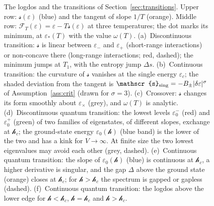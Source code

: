 \documentclass[10pt,a4paper]{article}
\theoremstyle{plain}
\newcommand{\lndos}{{logdos}}  %
\newcommand{\hfield}{\mathscr{h}}  %
\newcommand{\Fen}[1][T]{\mathscr{F}_{#1}}  %
\newcommand{\lds}{\mathscr{s}}  %
\begin{document}
\begin{figure}[htbp]
\caption{The \lndos{} and the transitions of Section~\ref{sec:transitions}.
Upper row: $\lds(\varepsilon)$ (blue) and the tangent of slope $1/T$
(orange). Middle row:
$\Fen(\varepsilon)=\varepsilon-T\lds(\varepsilon)$ at three temperatures; the
dot marks its minimum, at $\varepsilon_*(T)$ with the value $\omega(T)$.
(a)~Discontinuous transition: $\lds$ is linear between $\varepsilon_-$ and
$\varepsilon_+$ (short-range interactions) or non-concave there (long-range
interactions; red, dashed); the minimum jumps at $T_1$, with the entropy
jump $\Delta s$.
(b)~Continuous transition: the curvature of $\lds$ vanishes at the single
energy $\varepsilon_c$; the shaded deviation from the tangent is
$\lds_{\rm sing}=-B_\pm|\delta\varepsilon|^{\sigma}$ of
Assumption~\ref{ass:crit} (drawn for $\sigma=3$).
(c)~Crossover: $\lds$ changes its form smoothly about $\varepsilon_\times$
(grey), and $\omega(T)$ is analytic.
(d)~Discontinuous quantum transition: the lowest levels
$\varepsilon_0^{-}$ (red) and $\varepsilon_0^{+}$ (green) of two families of
eigenstates, of different slopes, exchange at $\hfield_c$; the ground-state
energy $\varepsilon_0(\hfield)$ (blue band) is the lower of the two and has
a kink for $V\to\infty$. At finite size the two lowest eigenvalues may avoid
each other (grey, dashed).
(e)~Continuous quantum transition: the slope of $\varepsilon_0(\hfield)$
(blue) is continuous at $\hfield_c$, a higher derivative is singular, and
the gap $\Delta$ above the ground state (orange) closes at $\hfield_c$; for
$\hfield>\hfield_c$ the spectrum is gapped or gapless (dashed).
(f)~Continuous quantum transition: the \lndos{} above the lower edge for
$\hfield<\hfield_c$, $\hfield=\hfield_c$ and $\hfield>\hfield_c$.}
\label{fig:transitions}
\end{figure}
\end{document}
